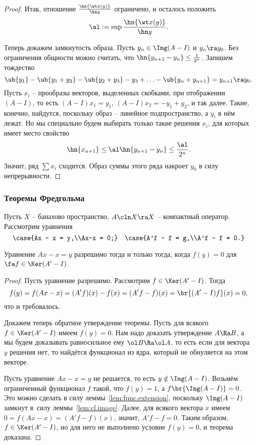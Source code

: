\documentclass[a4paper]{article}
\begin{document}
\begin{proof}
Итак, отношение $\frac{\hn{\wt x(y)}}{\hn y}$ ограничено, и осталось положить
$$\al := \sup \frac{\hn{\wt x(y)}}{\hn y}.$$

Теперь докажем замкнутость образа. Пусть $y_n \in \Img(A - I)$ и $y_n \ra y_0$. Без ограничения общности можно
считать, что $\hn{y_{n+1} - y_n} \le\frac1{2^n}$.
Запишем тождество
$$\ub{y_1} - \ub{y_1 + y_2} - \ub{y_2 + y_3} - y_3+\ldots -\ub{y_n+ y_{n+1}} = y_{n+1} \ra y_0.$$
Пусть $x_i$ -- прообразы векторов, выделенных скобками, при отображении $(A-I)$, то есть $(A-I)x_1 = y_1$,
$(A-I)x_2 = -y_1 + y_2$, и так далее. Такие, конечно, найдутся, поскольку образ -- линейное подпространство,
а $y_i$ в нём лежат. Но мы специально будем выбирать только такие решения $x_i$, для которых имеет место
свойство
$$\hn{x_{n+1}} \le \al\hn{y_{n+1}-y_n} \le \frac{\al}{2^n}.$$
Значит, ряд $\sum x_i$ сходится. Образ суммы этого ряда накроет $y_0$ в силу непрерывности.
\end{proof}

\subsubsection{Теоремы Фредгольма}

Пусть $X$ -- банахово пространство, $A\cln X \ra X$ -- компактный оператор. Рассмотрим уравнения
$$\case{Ax - x = y,\\Ax-x = 0;} \quad \case{A'f - f = g,\\A'f - f = 0.}$$

\begin{theorem}
Уравнение $Ax-x = y$ разрешимо тогда и только тогда, когда $f(y) = 0$ для $\fa f \in \Ker(A'-I)$.
\end{theorem}
\begin{proof}
Пусть уравнение разрешимо. Рассмотрим $f \in \Ker(A'-I)$. Тогда
$$f(y) = f(Ax-x) = (A'f)(x) - f(x) = (A'f-f)(x)= \br{(A'-I)f}(x) = 0,$$
что и требовалось.

Докажем теперь обратное утверждение теоремы. Пусть для всякого $f \in \Ker(A' - I)$ имеем $f(y) = 0$.
Нам надо доказать утверждение $A \Ra B$, а мы будем доказывать равносильное ему $\ol B \Ra \ol A$,
то есть если для вектора~$y$ решения нет, то найдётся функционал из ядра, который не обнуляется
на этом векторе.

Пусть уравнение $Ax -x = y$ не решается, то есть $y \notin \Img(A - I)$. Возьмём ограниченный
функционал $f$ такой, что $f(y) = 1$, а $f\br{\Img(A - I)} = 0$.
Это можно сделать в силу леммы~\ref{lem:func.extension}, поскольку $\Img(A-I)$ замкнут
в~силу леммы~\ref{lem:cl.image}.
Далее, для всякого вектора $x$ имеем $0 = f(Ax - x) = (A'f-f)(x)$, значит, $A'f-f = 0$. Таким
образом, $f \in \Ker(A'-I)$, но для него не выполнено условие $f(y) = 0$, и теорема доказана.
\end{proof}
\end{document}
